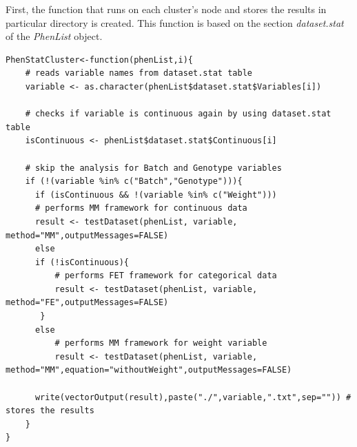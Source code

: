 \documentclass[12pt,a4paper]{article}
\begin{document}
First, the function that runs on each cluster's node and stores the results in particular directory is created. This function is based on the section \textit{dataset.stat} of the \textit{PhenList} object. 
\begingroup
\fontsize{8pt}{12pt}\selectfont
\begin{verbatim}
PhenStatCluster<-function(phenList,i){
    # reads variable names from dataset.stat table
    variable <- as.character(phenList$dataset.stat$Variables[i]) 
    
    # checks if variable is continuous again by using dataset.stat table
    isContinuous <- phenList$dataset.stat$Continuous[i]	
    
    # skip the analysis for Batch and Genotype variables
    if (!(variable %in% c("Batch","Genotype"))){	
      if (isContinuous && !(variable %in% c("Weight"))) 
	  # performs MM framework for continuous data
	  result <- testDataset(phenList, variable, method="MM",outputMessages=FALSE)	 
      else
	  if (!isContinuous){
	      # performs FET framework for categorical data
	      result <- testDataset(phenList, variable, method="FE",outputMessages=FALSE)	
	   }
	  else
	      # performs MM framework for weight variable
	      result <- testDataset(phenList, variable, method="MM",equation="withoutWeight",outputMessages=FALSE) 
	      
      write(vectorOutput(result),paste("./",variable,".txt",sep="")) # stores the results
    }
}
\end{verbatim}
\endgroup
\end{document}
